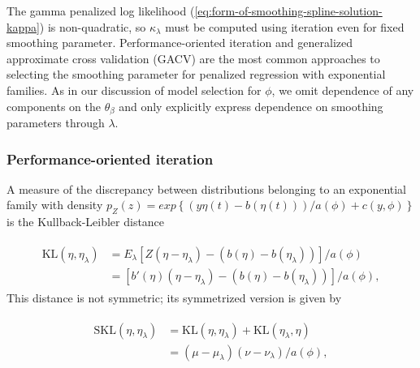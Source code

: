 The gamma penalized log likelihood (\ref{eq:form-of-smoothing-spline-solution-kappa}) is non-quadratic, so $\kappa_\lambda$ must be computed using iteration even for fixed smoothing parameter. Performance-oriented iteration and generalized approximate cross validation (GACV) are the most common approaches to selecting the smoothing parameter for penalized regression with exponential families. As in our discussion of model selection for $\phi$, we omit dependence of any components on the $\theta_\beta$ and only explicitly express dependence on smoothing parameters through $\lambda$.

\subsubsection{Performance-oriented iteration} 

A measure of the discrepancy between distributions belonging to an exponential family with density $p_Z\left(z\right) = exp\left\{\left(y \eta\left(t\right) - b\left(\eta\left(t\right)\right)\right)/a\left(\phi\right) + c\left(y,\phi\right) \right\}$ is the Kullback-Leibler distance

\begin{align}
\begin{split} \label{eq:kl-distance-definition}
\mbox{KL}\left(\eta, \eta_\lambda\right) &= E_\lambda\left[Z \left(\eta - \eta_\lambda \right) - \left(b\left(\eta\right)- b\left(\eta_\lambda\right) \right)\right]/a\left(\phi\right)\\
&=\left[ b'\left(\eta\right) \left(\eta - \eta_\lambda \right) - \left(b\left(\eta\right)- b\left(\eta_\lambda\right) \right)\right]/a\left(\phi\right),
\end{split}
\end{align}
\noindent
This distance is not symmetric; its symmetrized version is given by

\begin{align}
\begin{split} \label{eq:skl-distance-definition}
\mbox{SKL}\left(\eta, \eta_\lambda\right) &= \mbox{KL}\left(\eta, \eta_\lambda\right) + \mbox{KL}\left(\eta_\lambda, \eta \right)\\
&= \left(\mu - \mu_\lambda \right)\left( \nu - \nu_\lambda\right)/a\left(\phi\right),
\end{split}
\end{align}










